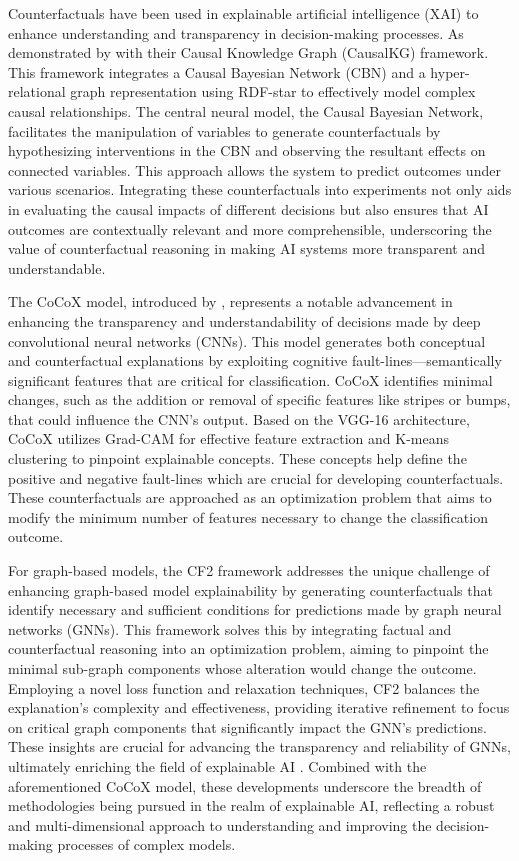 Counterfactuals have been used in explainable artificial intelligence (XAI) to
enhance understanding and transparency in decision-making processes. As demonstrated
by \textcite{jaimini_causalkg_2022} with their Causal Knowledge Graph (CausalKG)
framework. This framework integrates a Causal Bayesian Network (CBN) and a hyper-relational
graph representation using RDF-star to effectively model complex causal relationships.
The central neural model, the Causal Bayesian Network, facilitates the
manipulation of variables to generate counterfactuals by hypothesizing
interventions in the CBN and observing the resultant effects on connected
variables. This approach allows the system to predict outcomes under various scenarios.
Integrating these counterfactuals into experiments not only aids in evaluating
the causal impacts of different decisions but also ensures that AI outcomes are
contextually relevant and more comprehensible, underscoring the value of counterfactual
reasoning in making AI systems more transparent and understandable.

The CoCoX model, introduced by \textcite{akula_cocox_2020}, represents a notable
advancement in enhancing the transparency and understandability of decisions
made by deep convolutional neural networks (CNNs). This model generates both conceptual
and counterfactual explanations by exploiting cognitive fault-lines—semantically
significant features that are critical for classification. CoCoX identifies
minimal changes, such as the addition or removal of specific features like stripes
or bumps, that could influence the CNN's output. Based on the VGG-16 architecture,
CoCoX utilizes Grad-CAM for effective feature extraction and K-means clustering
to pinpoint explainable concepts. These concepts help define the positive and negative
fault-lines which are crucial for developing counterfactuals. These
counterfactuals are approached as an optimization problem that aims to modify
the minimum number of features necessary to change the classification outcome.

For graph-based models, the CF2 framework addresses the unique challenge of enhancing
graph-based model explainability by generating counterfactuals that identify necessary
and sufficient conditions for predictions made by graph neural networks (GNNs).
This framework solves this by integrating factual and counterfactual reasoning
into an optimization problem, aiming to pinpoint the minimal sub-graph components
whose alteration would change the outcome. Employing a novel loss function and
relaxation techniques, CF2 balances the explanation's complexity and effectiveness,
providing iterative refinement to focus on critical graph components that
significantly impact the GNN's predictions. These insights are crucial for advancing
the transparency and reliability of GNNs, ultimately enriching the field of
explainable AI \parencite{tan_learning_2022}. Combined with the aforementioned CoCoX model,
these developments underscore the breadth of methodologies being pursued in the
realm of explainable AI, reflecting a robust and multi-dimensional approach to understanding
and improving the decision-making processes of complex models.

